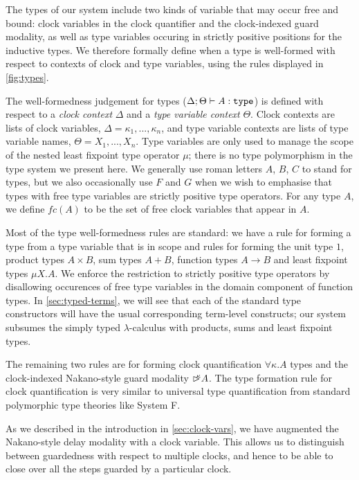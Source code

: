 The types of our system include two kinds of variable that may occur
free and bound: clock variables in the clock quantifier and the
clock-indexed guard modality, as well as type variables occuring in
strictly positive positions for the inductive types. We therefore
formally define when a type is well-formed with respect to contexts of
clock and type variables, using the rules displayed in
\autoref{fig:types}.

The well-formedness judgement for types ($\Delta; \Theta \vdash A :
\texttt{\textup{type}}$) is defined with respect to a \emph{clock context} $\Delta$
and a \emph{type variable context} $\Theta$. Clock contexts are lists
of clock variables, $\Delta = \kappa_1, ..., \kappa_n$, and type
variable contexts are lists of type variable names, $\Theta = X_1,
..., X_n$. Type variables are only used to manage the scope of the
nested least fixpoint type operator $\mu$; there is no type
polymorphism in the type system we present here. We generally use
roman letters $A$, $B$, $C$ to stand for types, but we also
occasionally use $F$ and $G$ when we wish to emphasise that types with
free type variables are strictly positive type operators. For any type
$A$, we define $\mathit{fc}(A)$ to be the set of free clock variables
that appear in $A$.

Most of the type well-formedness rules are standard: we have a rule
for forming a type from a type variable that is in scope and rules for
forming the unit type $1$, product types $A \times B$, sum types $A +
B$, function types $A \to B$ and least fixpoint types $\mu X. A$. We
enforce the restriction to strictly positive type operators by
disallowing occurences of free type variables in the domain component
of function types. In \autoref{sec:typed-terms}, we will see that each
of the standard type constructors will have the usual corresponding
term-level constructs; our system subsumes the simply typed
$\lambda$-calculus with products, sums and least fixpoint types.

The remaining two rules are for forming clock quantification $\forall
\kappa.A$ types and the clock-indexed Nakano-style guard modality
$\mathord{\rhd\kern-0.4em^{\kappa}} A$. The type formation rule for clock quantification is
very similar to universal type quantification from standard
polymorphic type theories like System F. 

As we described in the introduction in \autoref{sec:clock-vars}, we
have augmented the Nakano-style delay modality with a clock
variable. This allows us to distinguish between guardedness with
respect to multiple clocks, and hence to be able to close over all the
steps guarded by a particular clock.

